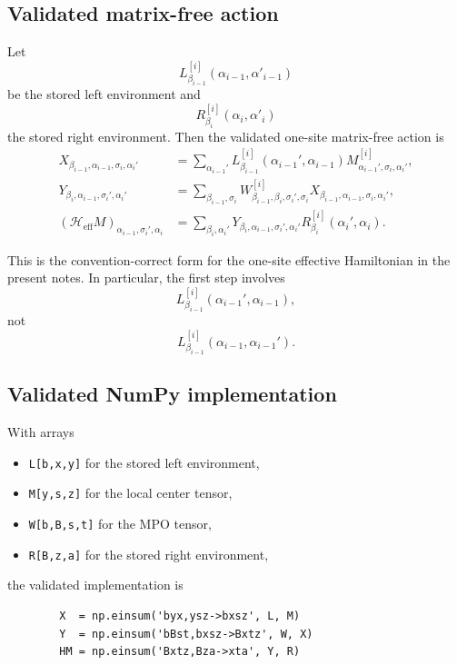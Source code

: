 \documentclass[aps,prb,onecolumn,nofootinbib]{revtex4-2}
\begin{document}
	\subsection{Validated matrix-free action}
	
	Let
	\[
	L^{[i]}_{\beta_{i-1}}(\alpha_{i-1},\alpha'_{i-1})
	\]
	be the stored left environment and
	\[
	R^{[i]}_{\beta_i}(\alpha_i,\alpha'_i)
	\]
	the stored right environment. Then the validated one-site matrix-free action is
	\begin{align}
		X_{\beta_{i-1},\alpha_{i-1},\sigma_i,\alpha_i'}
		&=
		\sum_{\alpha_{i-1}'}
		L^{[i]}_{\beta_{i-1}}(\alpha_{i-1}',\alpha_{i-1})
		M^{[i]}_{\alpha_{i-1}',\sigma_i,\alpha_i'},
		\label{eq:one-site-step1}
		\\
		Y_{\beta_i,\alpha_{i-1},\sigma_i',\alpha_i'}
		&=
		\sum_{\beta_{i-1},\sigma_i}
		W^{[i]}_{\beta_{i-1},\beta_i,\sigma_i',\sigma_i}
		X_{\beta_{i-1},\alpha_{i-1},\sigma_i,\alpha_i'},
		\label{eq:one-site-step2}
		\\
		(\mathcal{H}_{\mathrm{eff}}M)_{\alpha_{i-1},\sigma_i',\alpha_i}
		&=
		\sum_{\beta_i,\alpha_i'}
		Y_{\beta_i,\alpha_{i-1},\sigma_i',\alpha_i'}
		R^{[i]}_{\beta_i}(\alpha_i',\alpha_i).
		\label{eq:one-site-step3}
	\end{align}
	
	This is the convention-correct form for the one-site effective Hamiltonian in the present notes.
	In particular, the first step involves
	\[
	L^{[i]}_{\beta_{i-1}}(\alpha_{i-1}',\alpha_{i-1}),
	\]
	not
	\[
	L^{[i]}_{\beta_{i-1}}(\alpha_{i-1},\alpha_{i-1}').
	\]
	
	\subsection{Validated NumPy implementation}
	
	With arrays
	\begin{itemize}
		\item \texttt{L[b,x,y]} for the stored left environment,
		\item \texttt{M[y,s,z]} for the local center tensor,
		\item \texttt{W[b,B,s,t]} for the MPO tensor,
		\item \texttt{R[B,z,a]} for the stored right environment,
	\end{itemize}
	the validated implementation is
	\begin{verbatim}
		X  = np.einsum('byx,ysz->bxsz', L, M)
		Y  = np.einsum('bBst,bxsz->Bxtz', W, X)
		HM = np.einsum('Bxtz,Bza->xta', Y, R)
	\end{verbatim}
	
\end{document}

